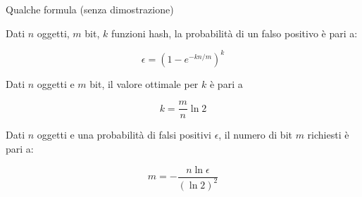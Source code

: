 \begin{frame}{Qualche formula (senza dimostrazione)}
\BI
\item Dati $n$ oggetti, $m$ bit, $k$ funzioni hash, la probabilità di un falso
positivo è pari a:

\[
 \epsilon = \left( 1 - e^{-kn/m} \right)^k
\]
\item Dati $n$ oggetti e $m$ bit, il valore ottimale per $k$ è pari a

\[
  k = \frac{m}{n}\ln 2
\]
\item Dati $n$ oggetti e una probabilità di falsi positivi $\epsilon$, il numero
di bit $m$ richiesti è pari a:

\[
 m = -\frac{n \ln \epsilon}{(\ln 2)^2}
\]
\EI

\end{frame}





